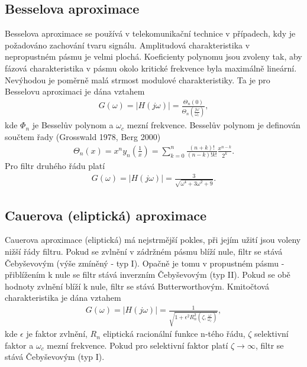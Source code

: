 \documentclass[twoside]{article}
\begin{document}
\subsection{Besselova aproximace}
Besselova aproximace se používá v telekomunikační technice v případech, kdy je požadováno zachování tvaru signálu. Amplitudová charakteristika v nepropustném pásmu je velmi plochá. Koeficienty polynomu jsou zvoleny tak, aby fázová charakteristika v pásmu okolo kritické frekvence byla maximálně lineární. Nevýhodou je poměrně malá strmost modulové charakteristiky. Ta je pro Besselovu aproximaci je dána vztahem
\begin{align}
G(\omega) = |H(j\omega)| = \frac{\Theta _n(0)}{\Theta _n(\frac{j\omega}{\omega _c})},
\end{align}
kde $\Phi _n$ je Besselův polynom a $\omega _c$ mezní frekvence. Besselův polynom je definován součtem řady (Grosswald 1978, Berg 2000)
\begin{align}
\Theta _n (x) = x^n y_n (\frac{1}{x}) = \sum_{k=0}^{n}\frac{(n+k)!}{(n-k)!k!}\frac{x^{n-k}}{2^k}.
\end{align}
Pro filtr druhého řádu platí
\begin{align}
G(\omega) = |H(j\omega)| = \frac{3}{\sqrt{\omega ^4 + 3\omega ^2 + 9}}.
\end{align}
\subsection{Cauerova (eliptická) aproximace}
\noindent Cauerova aproximace (eliptická) má nejstrmější pokles, při jejím užití jsou voleny nižší řády filtru. Pokud se zvlnění v zádržném pásmu blíží nule, filtr se stává Čebyševovým (výše zmíněný - typ I). Opačně je tomu v propustném pásmu - přiblížením k nule se filtr stává inverzním Čebyševovým (typ II).  Pokud se obě hodnoty zvlnění blíží k nule, filtr se stává Butterworthovým. Kmitočtová charakteristika je dána vztahem
\begin{align}
G(\omega) = |H(j\omega)| = \frac{1}{\sqrt{1 + \epsilon ^2 R_n ^2(\zeta, \frac{\omega}{\omega _c})}},
\end{align}
kde $\epsilon$ je faktor zvlnění, $R_n$ eliptická racionální funkce n-tého řádu, $\zeta$ selektivní faktor a $\omega _c$ mezní frekvence. Pokud pro selektivní faktor platí $\zeta \rightarrow \infty$, filtr se stává Čebyševovým (typ I). 
\newpage
\end{document}
